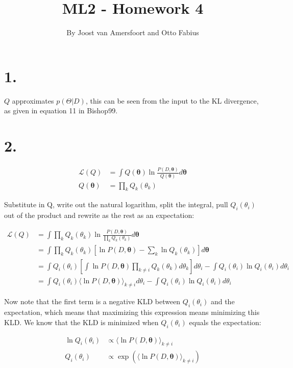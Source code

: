 \documentclass{article}
\def\*#1{\boldsymbol{#1}}
\begin{document}
\title{ML2 - Homework 4}
\author{By Joost van Amersfoort and Otto Fabius}
\maketitle

\section*{1.}

$Q$ approximates $p(\Theta|D)$, this can be seen from the input to the KL divergence, as given in equation 11 in Bishop99.

\section*{2.}

\begin{align*}
\mathcal{L}(Q) &= \int Q(\*\theta) \ln \frac{P(D, \*\theta)}{Q(\*\theta)}d\*\theta \\
Q(\*\theta) &= \prod_k Q_k(\theta_k)
\end{align*}

Substitute in Q, write out the natural logarithm, split the integral, pull $Q_i(\theta_i)$ out of the product and rewrite as the rest as an expectation:

\begin{align*}
\mathcal{L}(Q) &= \int \prod_k Q_k(\theta_k) \ln \frac{P(D, \*\theta)}{\prod_k Q_k(\theta_k)}d\*\theta \\
&= \int \prod_k Q_k(\theta_k) \left [ \ln P(D, \*\theta) - \sum_k \ln Q_k(\theta_k) \right ] d\*\theta \\
&= \int Q_i(\theta_i) \left [ \int \ln P(D, \*\theta) \prod_{k \neq i} Q_k(\theta_k) d\theta_k \right ] d\theta_i - \int Q_i(\theta_i) \ln Q_i(\theta_i) d\theta_i \\
&= \int Q_i(\theta_i) \langle \ln P(D, \*\theta) \rangle_{k \neq i} d\theta_i - \int Q_i(\theta_i) \ln Q_i(\theta_i) d\theta_i
\end{align*}

Now note that the first term is a negative KLD between $Q_i(\theta_i)$ and the expectation, which means that maximizing this expression means minimizing this KLD. We know that the KLD is minimized when $Q_i(\theta_i)$ equals the expectation:

\begin{align*}
\ln Q_i(\theta_i) & \propto \langle \ln P(D, \*\theta) \rangle_{k \neq i} \\
Q_i(\theta_i) &\propto \exp (\langle \ln P(D, \*\theta) \rangle_{k \neq i}) \\
\end{align*}
\end{document}
